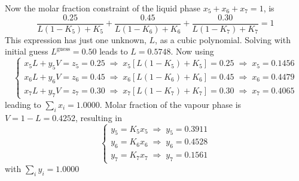 \documentclass[12pts,a4paper,amsmath,amssymb,floatfix]{article}%
\newcommand{\frc}{\displaystyle\frac}
\newcommand{\summation}[3][error]{\sum\limits_{#2}^{#3}#1}
\begin{document}
\begin{enumerate}[1)]
   Now the molar fraction constraint of the liquid phase $x_{5}+x_{6}+x_{7} = 1$, is
   \begin{displaymath}
        \frc{0.25}{L\left(1-K_{5}\right)+K_{5}} + \frc{0.45}{L\left(1-K_{6}\right)+K_{6}} + \frc{0.30}{L\left(1-K_{7}\right)+K_{7}} = 1
   \end{displaymath}
   This expression has just one unknown, $L$, as a cubic polynomial. Solving with initial guess $L^{\text{guess}}=0.50$ leads to $L=0.5748$.  Now using 
    \begin{displaymath}
        \begin{cases}
            x_{5}L + y_{5}V = z_{5} = 0.25 \;\Longrightarrow\; x_{5}\left[L\left(1-K_{5}\right)+K_{5}\right] = 0.25  \;\Longrightarrow\;  x_{5} = 0.1456 \\
            x_{6}L + y_{6}V = z_{6} = 0.45 \;\Longrightarrow\; x_{6}\left[L\left(1-K_{6}\right)+K_{6}\right] = 0.45  \;\Longrightarrow\;  x_{6} = 0.4479 \\
            x_{7}L + y_{7}V = z_{7} = 0.30 \;\Longrightarrow\; x_{7}\left[L\left(1-K_{7}\right)+K_{7}\right] = 0.30  \;\Longrightarrow\;  x_{7} = 0.4065 
        \end{cases}
   \end{displaymath}
   leading to $\summation[x_{i}]{i}{} = 1.0000$. Molar fraction of the vapour phase is $V= 1-L=0.4252$, resulting in
    \begin{displaymath}
        \begin{cases}
            y_{5} = K_{5}x_{5} \;\Longrightarrow\; y_{5} = 0.3911 \\
            y_{6} = K_{6}x_{6} \;\Longrightarrow\; y_{6} = 0.4528 \\
            y_{7} = K_{7}x_{7} \;\Longrightarrow\; y_{7} = 0.1561 
        \end{cases}
   \end{displaymath}
    with $\summation[y_{i}]{i}{} = 1.0000$

%
\end{enumerate}

\clearpage
\end{document}
